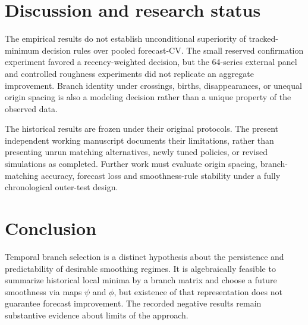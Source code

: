\section{Discussion and research status}
\label{sec:branch_discussion}
The empirical results do not establish unconditional superiority
of tracked-minimum decision rules over pooled forecast-CV.
The small reserved confirmation experiment favored a
recency-weighted decision, but the 64-series external
panel and controlled roughness experiments did not
replicate an aggregate improvement. Branch identity
under crossings, births, disappearances, or unequal
origin spacing is also a modeling decision rather
than a unique property of the observed data.

The historical results are frozen under their original
protocols. The present independent working manuscript
documents their limitations, rather than presenting
unrun matching alternatives, newly tuned policies, or
revised simulations as completed. Further work must
evaluate origin spacing, branch-matching accuracy,
forecast loss and smoothness-rule stability under
a fully chronological outer-test design.

\section{Conclusion}
Temporal branch selection is a distinct hypothesis about
the persistence and predictability of desirable smoothing
regimes. It is algebraically feasible to summarize historical
local minima by a branch matrix and choose a future
smoothness via maps $\psi$ and $\phi$, but existence of that
representation does not guarantee forecast improvement.
The recorded negative results remain substantive evidence
about limits of the approach.
